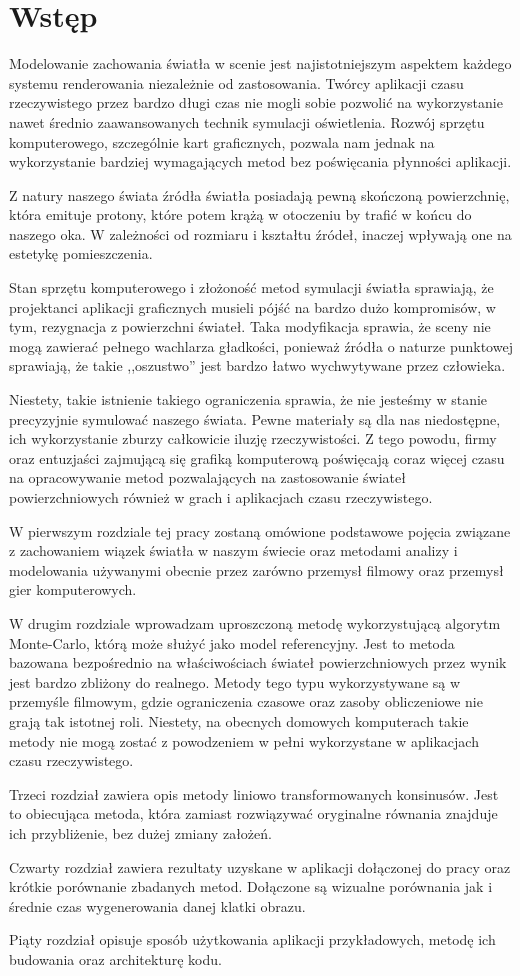 \documentclass[../main.tex]{subfiles}
\begin{document}
\chapter*{Wstęp}

Modelowanie zachowania światła w scenie jest najistotniejszym aspektem każdego systemu renderowania niezależnie od zastosowania. Twórcy aplikacji czasu rzeczywistego przez bardzo długi czas nie mogli sobie pozwolić na wykorzystanie nawet średnio zaawansowanych technik symulacji oświetlenia. Rozwój sprzętu komputerowego, szczególnie kart graficznych, pozwala nam jednak na wykorzystanie bardziej wymagających metod bez poświęcania płynności aplikacji.

Z natury naszego świata źródła światła posiadają pewną skończoną powierzchnię, która emituje protony, które potem krążą w otoczeniu by trafić w końcu do naszego oka. W zależności od rozmiaru i kształtu źródeł, inaczej wpływają one na estetykę pomieszczenia.

Stan sprzętu komputerowego i złożoność metod symulacji światła sprawiają, że projektanci aplikacji graficznych musieli pójść na bardzo dużo kompromisów, w tym, rezygnacja z powierzchni świateł. Taka modyfikacja sprawia, że sceny nie mogą zawierać pełnego wachlarza gładkości, ponieważ źródła o naturze punktowej sprawiają, że takie ,,oszustwo'' jest bardzo łatwo wychwytywane przez człowieka.

Niestety, takie istnienie takiego ograniczenia sprawia, że nie jesteśmy w stanie precyzyjnie symulować naszego świata. Pewne materiały są dla nas niedostępne, ich wykorzystanie zburzy całkowicie iluzję rzeczywistości. Z tego powodu, firmy oraz entuzjaści zajmującą się grafiką komputerową poświęcają coraz więcej czasu na opracowywanie metod pozwalających na zastosowanie świateł powierzchniowych również w grach i aplikacjach czasu rzeczywistego. 

W pierwszym rozdziale tej pracy zostaną omówione podstawowe pojęcia związane z zachowaniem wiązek światła w naszym świecie oraz metodami analizy i modelowania używanymi obecnie przez zarówno przemysł filmowy oraz przemysł gier komputerowych.

W drugim rozdziale wprowadzam uproszczoną metodę wykorzystującą algorytm Monte-Carlo, którą może służyć jako model referencyjny. Jest to metoda bazowana bezpośrednio na właściwościach świateł powierzchniowych przez wynik jest bardzo zbliżony do realnego. Metody tego typu wykorzystywane są w przemyśle filmowym, gdzie ograniczenia czasowe oraz zasoby obliczeniowe nie grają tak istotnej roli. Niestety, na obecnych domowych komputerach takie metody nie mogą zostać z powodzeniem w pełni wykorzystane w aplikacjach czasu rzeczywistego. 

Trzeci rozdział zawiera opis metody liniowo transformowanych konsinusów. Jest to obiecująca metoda, która zamiast rozwiązywać oryginalne równania znajduje ich przybliżenie, bez dużej zmiany założeń.

Czwarty rozdział zawiera rezultaty uzyskane w aplikacji dołączonej do pracy oraz krótkie porównanie zbadanych metod. Dołączone są wizualne porównania jak i średnie czas wygenerowania danej klatki obrazu.

Piąty rozdział opisuje sposób użytkowania aplikacji przykładowych, metodę ich budowania oraz architekturę kodu.
\end{document}
